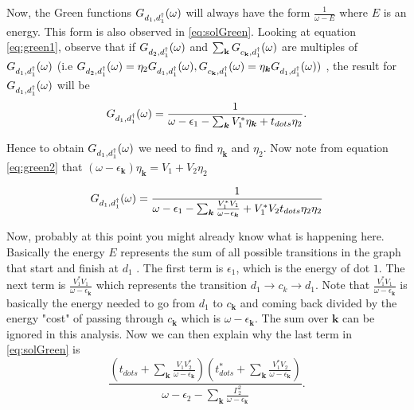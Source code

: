 Now, the Green functions $G_{d_{1},d_{1}^{\dagger}}(\omega)$ will always have the form $\frac{1}{\omega-E} $ where $E$ is an energy. This form is also observed in \ref{eq:solGreen}.  Looking at equation \ref{eq:green1},  observe that if $G_{d_{2},d_{1}^{\dagger}}(\omega)$ and $\sum_{\mathbf{k}}G_{c_{\mathbf{k}},d_{1}^{\dagger}}(\omega)$ are multiples of $G_{d_{1},d_{1}^{\dagger}}(\omega)$ (i.e $G_{d_{2},d_{1}^{\dagger}}(\omega)=\eta_{2}G_{d_{1},d_{1}^{\dagger}}(\omega),G_{c_{\mathbf{k}},d_{1}^{\dagger}}(\omega)=\eta_{\boldsymbol{k}}G_{d_{1},d_{1}^{\dagger}}(\omega))$ , the result for $G_{d_{1},d_{1}^{\dagger}}(\omega)$ will be 
\begin{equation}
    G_{d_{1},d_{1}^{\dagger}}(\omega)=\frac{1}{\omega-\epsilon_{1}-\sum_{\boldsymbol{k}}V_{1}^{*}\eta_{\boldsymbol{k}}+t_{dots}\eta_{2}}.
\end{equation}

Hence to obtain $G_{d_{1},d_{1}^{\dagger}}(\omega)$ we need to find $\eta_{\boldsymbol{k}}$ and $\eta_{2}$. Now note from equation \eqref{eq:green2} that $\left(\omega-\epsilon_{\boldsymbol{k}}\right)\eta_{\boldsymbol{k}}=V_{1}+V_{2}\eta_{2}$

\begin{equation}
G_{d_{1},d_{1}^{\dagger}}(\omega)=\frac{1}{\omega-\epsilon_{1}-\sum_{\boldsymbol{k}}\frac{V_{1}^{*}V_{1}}{\omega-\epsilon_{\boldsymbol{k}}}+V_{1}^{*}V_{2}t_{dots}\eta_{2}\eta_{2}}    
\end{equation}


Now, probably at this point you might already know what is happening here. Basically the energy $E$ represents the sum of all possible transitions in the graph that start and finish at $d_{1}$ . The first term is $\epsilon_{1}$, which is the energy of dot $1$. The next term is $\frac{V_{1}^{*}V_{1}}{\omega-\epsilon_{\boldsymbol{k}}}$ which represents the transition $d_{1}\rightarrow c_{k}\rightarrow d_{1}$. Note that $\frac{V_{1}^{*}V_{1}}{\omega-\epsilon_{\boldsymbol{k}}}$ is basically the energy needed to go from $d_{1}$ to $c_{\boldsymbol{k}}$ and coming back divided by the energy "cost" of passing through $c_{\boldsymbol{k}}$ which is $\omega-\epsilon_{\boldsymbol{k}}$. The sum over $\textbf{k}$ can be ignored in this analysis. Now we can then explain why the last term in \eqref{eq:solGreen} is 
\begin{equation}
    \frac{\left(t_{dots}+\sum_{\mathbf{k}}\frac{V_{1}V_{2}^{*}}{\omega-\epsilon_{\mathbf{k}}}\right)\left(t_{dots}^{*}+\sum_{\mathbf{k}}\frac{V_{1}^{*}V_{2}}{\omega-\epsilon_{\mathbf{k}}}\right)}{\omega-\epsilon_{2}-\sum_{\mathbf{k}}\frac{\Gamma_{2}^{2}}{\omega-\epsilon_{\mathbf{k}}}}. \label{term}
\end{equation}

